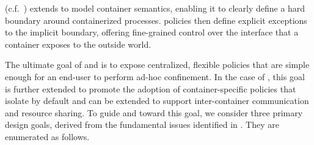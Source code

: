 \bpfcontain{} (c.f.~) extends \bpfbox{} to model container semantics,
enabling it to clearly define a hard boundary around containerized processes.
\bpfcontain{} policies then define explicit exceptions to the implicit boundary, offering
fine-grained control over the interface that a container exposes to the outside world.

The ultimate goal of \bpfbox{} and \bpfcontain{} is to expose centralized, flexible
policies that are simple enough for an end-user to perform ad-hoc confinement. In the case
of \bpfcontain{}, this goal is further extended to promote the adoption of
container-specific policies that isolate by default and can be extended to support
inter-container communication and resource sharing. To guide \bpfbox{} and \bpfcontain{}
toward this goal, we consider three primary design goals, derived from the fundamental
issues identified in . They are enumerated as follows.



